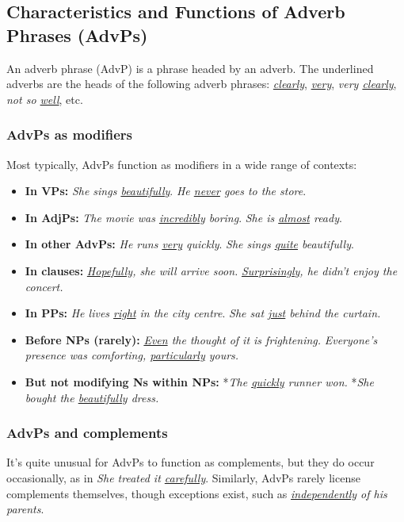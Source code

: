 \subsection{Characteristics and Functions of Adverb Phrases (AdvPs)} \label{sec:advps}

An adverb phrase (AdvP) is a phrase headed by an adverb. The underlined adverbs are the heads of the following adverb phrases: \textit{\uline{clearly}}, \textit{\uline{very}}, \textit{very \uline{clearly}}, \textit{not so \uline{well}}, etc.

\subsubsection*{AdvPs as modifiers}

Most typically, AdvPs function as modifiers in a wide range of contexts:

\begin{itemize}
    \item \textbf{In VPs:} \textit{She {\ob}sings \uline{beautifully}\cb}. \textit{He {\ob}\uline{never} goes to the store\cb}.
    \item \textbf{In AdjPs:} \textit{The movie was {\ob}\uline{incredibly} boring\cb}. \textit{She is {\ob}\uline{almost} ready\cb}.
    \item \textbf{In other AdvPs:} \textit{He runs {\ob}\uline{very} quickly\cb}.  \textit{She sings {\ob}\uline{quite} beautifully\cb}.
    \item \textbf{In clauses:} \textit{\uline{Hopefully}, she will arrive soon.} \textit{\uline{Surprisingly}, he didn't enjoy the concert.}
    \item \textbf{In PPs:} \textit{He lives {\ob}\uline{right} in the city centre\cb}. \textit{She sat {\ob}\uline{just} behind the curtain\cb.}
    \item \textbf{Before NPs (rarely):} \textit{{\ob}\uline{Even} the thought of it{\cb} is frightening.} \textit{Everyone's presence was comforting, {\ob}\uline{particularly} yours\cb.}
    \item \textbf{But not modifying Ns within NPs:} *\textit{{\ob}The \uline{quickly} runner{\cb} won.} *\textit{She bought {\ob}the \uline{beautifully} dress\cb.}
\end{itemize}

\subsubsection*{AdvPs and complements} \label{sec:AdvPs+Comps}
It's quite unusual for AdvPs to function as complements, but they do occur occasionally, as in \textit{She treated it \uline{carefully}}. Similarly, AdvPs rarely license complements themselves, though exceptions exist, such as \textit{\uline{independently} of his parents}.

